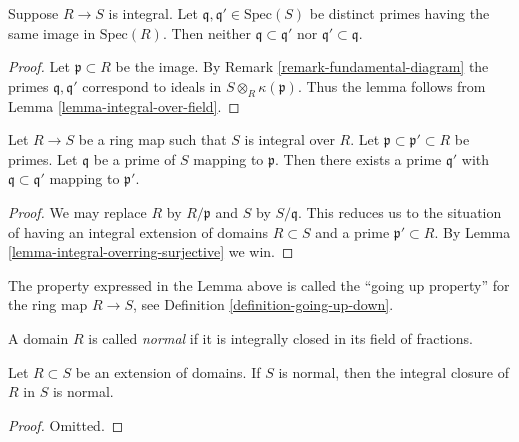 \begin{lemma}
\label{lemma-integral-no-inclusion}
Suppose $R \to S$ is integral.
Let $\mathfrak q, \mathfrak q' \in \text{Spec}(S)$
be distinct primes
having the same image in $\text{Spec}(R)$.
Then neither $\mathfrak q \subset \mathfrak q'$
nor $\mathfrak q' \subset \mathfrak q$.
\end{lemma}

\begin{proof}
Let $\mathfrak p \subset R$ be the image.
By Remark \ref{remark-fundamental-diagram}
the primes $\mathfrak q, \mathfrak q'$
correspond to ideals in
$S \otimes_R \kappa(\mathfrak p)$.
Thus the lemma follows from Lemma \ref{lemma-integral-over-field}.
\end{proof}

\begin{lemma}
\label{lemma-integral-going-up}
Let $R \to S$ be a ring map such that
$S$ is integral over $R$.
Let $\mathfrak p \subset \mathfrak p' \subset R$
be primes. Let $\mathfrak q$ be a prime of $S$ mapping
to $\mathfrak p$. Then there exists a prime $\mathfrak q'$
with $\mathfrak q \subset \mathfrak q'$
mapping to $\mathfrak p'$.
\end{lemma}

\begin{proof}
We may replace $R$ by $R/\mathfrak p$ and $S$ by $S/\mathfrak q$.
This reduces us to the situation of having an integral
extension of domains $R \subset S$ and a prime $\mathfrak p' \subset R$.
By Lemma \ref{lemma-integral-overring-surjective} we win.
\end{proof}

\noindent
The property expressed in the Lemma above is called
the ``going up property'' for the ring map $R \to S$,
see Definition \ref{definition-going-up-down}.

\begin{definition}
\label{definition-domain-normal}
A domain $R$ is called {\it normal} if it is integrally
closed in its field of fractions.
\end{definition}

\begin{lemma}
\label{lemma-integral-closure-in-normal}
Let $R \subset S$ be an extension of domains.
If $S$ is normal, then the integral closure of $R$
in $S$ is normal.
\end{lemma}

\begin{proof}
Omitted.
\end{proof}

